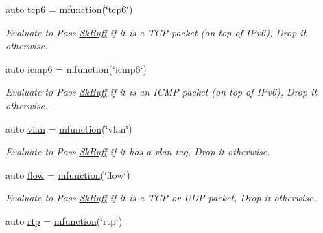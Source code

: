 \begin{DoxyCompactItemize}
auto \hyperlink{namespacepfq_1_1lang_1_1anonymous__namespace_02default_8hpp_03_ad5806a9b77c5975d08f0d0d317faa7a0}{tcp6} = \hyperlink{namespacepfq_1_1lang_ac3ec84f09576bf5fb5db464623a4c165}{mfunction}(\char`\"{}tcp6\char`\"{})
\begin{DoxyCompactList}\small\item\em Evaluate to {\ttfamily Pass} \hyperlink{structpfq_1_1lang_1_1SkBuff}{Sk\+Buff} if it is a T\+C\+P packet (on top of I\+Pv6), {\ttfamily Drop} it otherwise. \end{DoxyCompactList}\item 
auto \hyperlink{namespacepfq_1_1lang_1_1anonymous__namespace_02default_8hpp_03_a8fda9498af823eec4f9f8d81d4a171d5}{icmp6} = \hyperlink{namespacepfq_1_1lang_ac3ec84f09576bf5fb5db464623a4c165}{mfunction}(\char`\"{}icmp6\char`\"{})
\begin{DoxyCompactList}\small\item\em Evaluate to {\ttfamily Pass} \hyperlink{structpfq_1_1lang_1_1SkBuff}{Sk\+Buff} if it is an I\+C\+M\+P packet (on top of I\+Pv6), {\ttfamily Drop} it otherwise. \end{DoxyCompactList}\item 
auto \hyperlink{namespacepfq_1_1lang_1_1anonymous__namespace_02default_8hpp_03_a747e907a678ad69c5bfdd3048a239b6a}{vlan} = \hyperlink{namespacepfq_1_1lang_ac3ec84f09576bf5fb5db464623a4c165}{mfunction}(\char`\"{}vlan\char`\"{})
\begin{DoxyCompactList}\small\item\em Evaluate to {\ttfamily Pass} \hyperlink{structpfq_1_1lang_1_1SkBuff}{Sk\+Buff} if it has a vlan tag, {\ttfamily Drop} it otherwise. \end{DoxyCompactList}\item 
auto \hyperlink{namespacepfq_1_1lang_1_1anonymous__namespace_02default_8hpp_03_af6c7518847c8c960b0e98cd856871a1b}{flow} = \hyperlink{namespacepfq_1_1lang_ac3ec84f09576bf5fb5db464623a4c165}{mfunction}(\char`\"{}flow\char`\"{})
\begin{DoxyCompactList}\small\item\em Evaluate to {\ttfamily Pass} \hyperlink{structpfq_1_1lang_1_1SkBuff}{Sk\+Buff} if it is a T\+C\+P or U\+D\+P packet, {\ttfamily Drop} it otherwise. \end{DoxyCompactList}\item 
auto \hyperlink{namespacepfq_1_1lang_1_1anonymous__namespace_02default_8hpp_03_aa8ac230fe8eeb0bccee8e31ba032cb8e}{rtp} = \hyperlink{namespacepfq_1_1lang_ac3ec84f09576bf5fb5db464623a4c165}{mfunction}(\char`\"{}rtp\char`\"{})

\end{DoxyCompactItemize}
